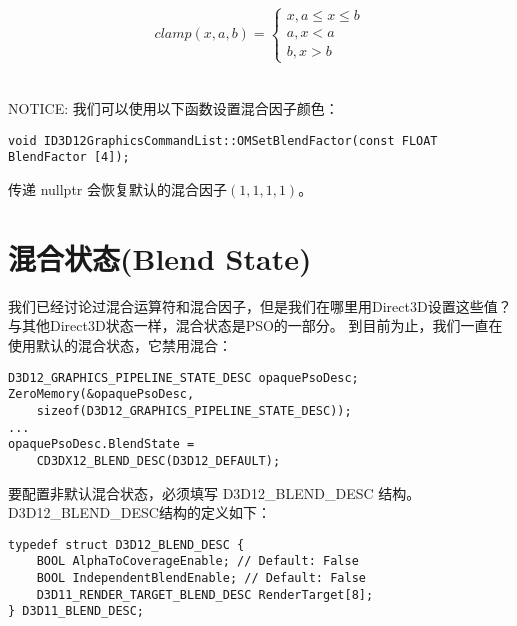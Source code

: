 \begin{align*}
clamp(x,a,b)=\left\{\begin{matrix}
x,a\leq x \leq b\\ 
a,x<a\\ 
b,x>b
\end{matrix}\right.
\end{align*}

\begin{flushleft}
~\\
NOTICE: 我们可以使用以下函数设置混合因子颜色：\\
\end{flushleft}
\begin{lstlisting}
void ID3D12GraphicsCommandList::OMSetBlendFactor(const FLOAT BlendFactor [4]); 
\end{lstlisting}

\begin{flushleft}
传递 nullptr 会恢复默认的混合因子$(1,1,1,1)$。
~\\
\end{flushleft}

\section{混合状态(Blend State)}
\begin{flushleft}
我们已经讨论过混合运算符和混合因子，但是我们在哪里用Direct3D设置这些值？ 与其他Direct3D状态一样，混合状态是PSO的一部分。 到目前为止，我们一直在使用默认的混合状态，它禁用混合：\\
\end{flushleft}

\begin{lstlisting}
D3D12_GRAPHICS_PIPELINE_STATE_DESC opaquePsoDesc;
ZeroMemory(&opaquePsoDesc,
    sizeof(D3D12_GRAPHICS_PIPELINE_STATE_DESC));
...
opaquePsoDesc.BlendState =
    CD3DX12_BLEND_DESC(D3D12_DEFAULT);
\end{lstlisting}

\begin{flushleft}
要配置非默认混合状态，必须填写 D3D12\_BLEND\_DESC 结构。D3D12\_BLEND\_DESC结构的定义如下：\\
\end{flushleft}

\begin{lstlisting}
typedef struct D3D12_BLEND_DESC {
    BOOL AlphaToCoverageEnable; // Default: False
    BOOL IndependentBlendEnable; // Default: False
    D3D11_RENDER_TARGET_BLEND_DESC RenderTarget[8];
} D3D11_BLEND_DESC;
\end{lstlisting}

